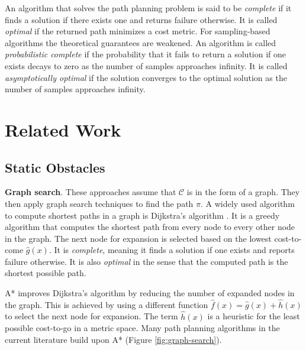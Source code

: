 \documentclass[]{article}
\begin{document}
An algorithm that solves the path planning problem is said to be
\textit{complete} if it finds a solution if there exists one and
returns failure otherwise. It is called \textit{optimal} if the
returned path minimizes a cost metric. For sampling-based algorithms
the theoretical guarantees are weakened. An algorithm is called
\textit{probabilistic complete} if the probability that it fails to
return a solution if one exists decays to zero as the number of
samples approaches infinity. It is called \textit{asymptotically
  optimal} if the solution converges to the optimal solution as the
number of samples approaches infinity.

\section*{Related Work}
\subsection*{Static Obstacles}
\textbf{Graph search}. These approaches assume that \(\mathcal{C}\) is
in the form of a graph. They then apply graph search techniques to
find the path \(\pi\). A widely used algorithm to compute shortest
paths in a graph is Dijkstra's algorithm
\cite{dijkstraNoteTwoProblems1959}. It is a greedy algorithm that
computes the shortest path from every node to every other node in the
graph. The next node for expansion is selected based on the lowest
cost-to-come \(\hat g(x)\). It is \textit{complete}, meaning it finds
a solution if one exists and reports failure otherwise. It is also
\textit{optimal} in the sense that the computed path is the shortest
possible path.

A* \cite{hartFormalBasisHeuristic1968} improves Dijkstra's algorithm
by reducing the number of expanded nodes in the graph. This is
achieved by using a different function
\(\hat f(x) = \hat g(x) + \hat h(x)\) to select the next node for
expansion. The term \(\hat h(x)\) is a heuristic for the least
possible cost-to-go in a metric space. Many path planning algorithms
in the current literature build upon A* (Figure
\ref{fig:graph-search}).
\end{document}
